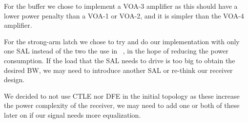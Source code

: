 For the buffer we chose to implement a VOA-3 amplifier as this should have a lower power penalty than a VOA-1 or VOA-2, and it is simpler than the VOA-4 amplifier.

For the strong-arm latch we chose to try and do our implementation with only one SAL instead of the two the use in ~\cite{mahony2010a}, in the hope of reducing the power consumption. If the load that the SAL needs to drive is too big to obtain the desired BW, we may need to introduce another SAL or re-think our receiver design.

We decided to not use CTLE nor DFE in the initial topology as these increase the power complexity of the receiver, we may need to add one or both of these later on if our signal needs more equalization.
